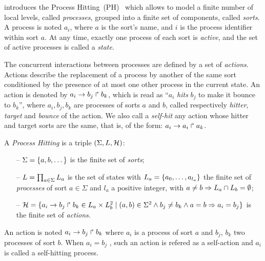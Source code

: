 

 introduces the Process Hitting~(PH)~\cite{pauleve2011modelisation}
which allows to model
a finite number of local levels,
called \emph{processes},
grouped into a finite set of components, called \emph{sorts}.
A process is noted $a_i$, where $a$ is the sort's name,
and $i$ is the process identifier within sort $a$.
At any time, exactly one process of each sort is \emph{active},
and the set of active processes is called a \emph{state}.

The concurrent interactions between processes are defined by a set of \emph{actions}.
Actions describe the replacement of a process by another of the same sort
conditioned by the presence of at most one other process in the current state.
An action is denoted by $a_i\rightarrow b_j\Rsh b_k$, which is read as
``$a_i$ \emph{hits} $b_j$ to make it bounce to $b_k$'',
where $a_i,b_j,b_k$ are processes of sorts $a$ and $b$,
called respectively \emph{hitter}, \emph{target} and
\emph{bounce} of the action.
We also call a \emph{self-hit} any action whose hitter and target sorts are the same,
that is, of the form: $a_i\rightarrow a_i\Rsh a_k$.

\begin{definition}\label{def:PH}
  A \emph{Process Hitting} is a triple $(\Sigma,L,\mathcal{H})$:
  \begin{itemize}
    \item[--]  $\Sigma = \{a,b,\dots\}$ is the finite set of \emph{sorts};
    \item[--]  $L = \prod_{a\in\Sigma} L_a$ is the set of states with
      $L_a = \{a_0,\dots,a_{l_a}\}$
      the finite set of \emph{processes} of sort $a\in\Sigma$
      and $l_a$ a positive integer, with $a\neq b\Rightarrow L_a \cap L_b = \emptyset$;
    \item[--]  $\mathcal{H} = \{ a_i\rightarrow b_j\Rsh b_k \in L_a \times L_b^2 \mid
      (a,b) \in \Sigma^2 \wedge b_j\neq b_k \wedge a=b\Rightarrow a_i=b_j\}$
      is the finite set of \emph{actions}.
  \end{itemize}
\end{definition}

\begin{definition}[Action]
\label{def:PhAction}
An action is noted $a_i\rightarrow b_j\Rsh b_k$ where $a_i$ is a process
of sort $a$ and $b_j$, $b_k$ two processes of sort $b$. When $a_i = b_j$ , such an action is refered as a self-action and $a_i$
is called a self-hitting process.
\end{definition}

